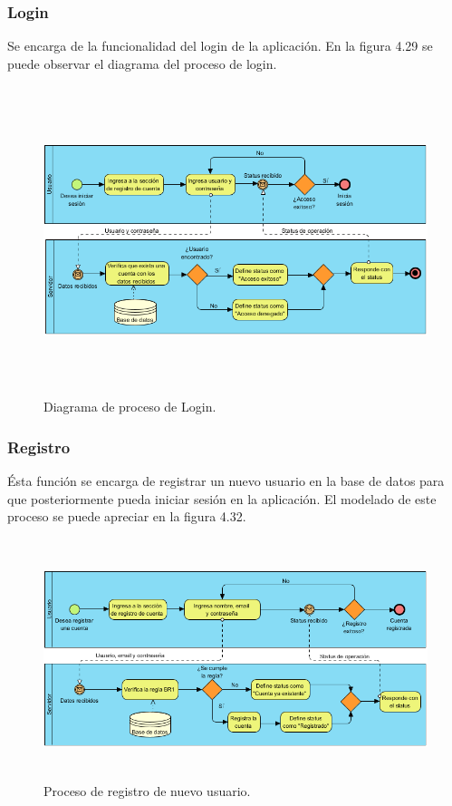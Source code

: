 \subsubsection{Login}
Se encarga de la funcionalidad del login de la aplicación. En la figura 4.29 se puede observar el diagrama del proceso de login.\par
\begin{figure}[h!]
	\centering
	\includegraphics[width=15cm,height=9cm]{imagenes/desarrollo/diagramas/BPMN_LOGIN.png}
	\caption{Diagrama de proceso de Login.}
	\label{fig:loginsuccess}
\end{figure}

\subsubsection{Registro}
Ésta función se encarga de registrar un nuevo usuario en la base de datos para que posteriormente pueda iniciar sesión en la aplicación. El modelado de este proceso se puede apreciar en la figura 4.32. \par
\begin{figure}[h!]
	\centering
	\includegraphics[width=15cm,height=7cm]{imagenes/desarrollo/diagramas/BPMN_REGISTRAR_CUENTA.png}
	\caption{Proceso de registro de nuevo usuario.}
	\label{fig:regsuccess}
\end{figure}
\par

